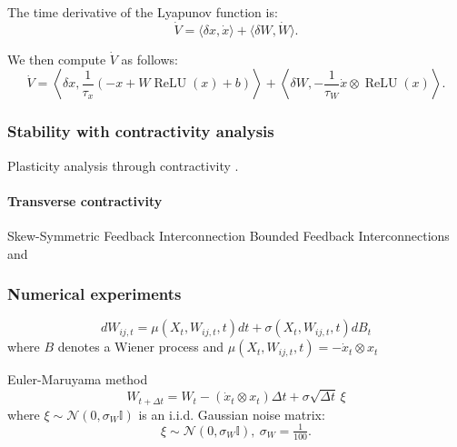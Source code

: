 \documentclass{article}
\theoremstyle{definition} \newtheorem{definition}{Definition}
\theoremstyle{remark} \newtheorem{remark}{Remark}
\newcounter{ct}
\begin{document}
The time derivative of the Lyapunov function is:
\[
\dot{V} = \langle \delta x, \dot{x} \rangle + \langle \delta W, \dot{W} \rangle.
\]

We then compute \(\dot{V}\) as follows:
\[
\dot{V} = \left\langle \delta x, \frac{1}{\tau_x} \left( -x + W \operatorname{ReLU}(x) + b \right) \right\rangle 
+ \left\langle \delta W, -\frac{1}{\tau_W} \dot{x} \otimes \operatorname{ReLU}(x) \right\rangle.
\]

\subsubsection{Stability with contractivity analysis}

Plasticity analysis through contractivity \citep{kozachkov2022matrix} \citep{centorrino2024modeling}.

\paragraph{Transverse contractivity}
Skew-Symmetric Feedback Interconnection \citep{manchester2014transverse}
Bounded Feedback Interconnections \citep{wang2005contraction} and \citep{manchester2014transverse}





\subsubsection{Numerical experiments}
\begin{equation}
dW_{ij,t} = \mu(X_t, W_{ij,t}, t)dt + \sigma(X_t, W_{ij,t}, t)dB_t
\end{equation}
 where $B$ denotes a Wiener process and $ \mu(X_t, W_{ij,t}, t) = -\dot x_t \otimes x_t$

Euler-Maruyama method
\[
W_{t+\Delta t} = W_t -( \dot x_t \otimes x_t) \Delta t + \sigma \sqrt{\Delta t} \, \xi
\]
where \(\xi \sim \mathcal{N}(0, \sigma_W\mathbb{I})\) is an i.i.d. Gaussian noise matrix:
\begin{equation}
\xi \sim \mathcal{N}(0,\sigma_W\mathbb{I}), \ \sigma_W=\tfrac{1}{100}.
\end{equation}


\end{document}

